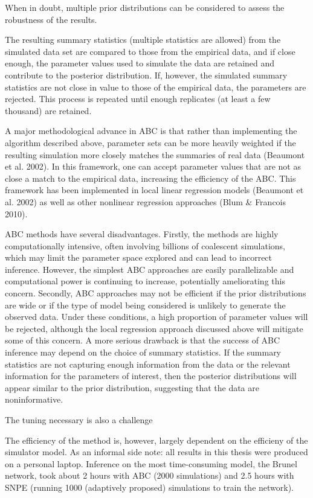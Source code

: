 When in doubt, multiple prior distributions can be considered to assess the robustness of the results. 

The resulting summary statistics (multiple statistics are allowed) from the simulated data set are compared to those from the empirical data, and if close enough, the parameter values used to simulate the data are retained and contribute to the posterior distribution. If, however, the simulated summary statistics are not close in value to those of the empirical data, the parameters are rejected. This process is repeated until enough replicates (at least a few thousand) are retained. 

A major methodological advance in ABC is that rather than implementing the algorithm described above, parameter sets can be more heavily weighted if the resulting simulation more closely matches the summaries of real data (Beaumont et al. 2002). In this framework, one can accept parameter values that are not as close a match to the empirical data, increasing the efficiency of the ABC. This framework has been implemented in local linear regression models (Beaumont et al. 2002) as well as other nonlinear regression approaches (Blum \& Francois 2010). 

ABC methods have several disadvantages. Firstly, the methods are highly computationally intensive, often involving billions of coalescent simulations, which may limit the parameter space explored and can lead to incorrect inference. However, the simplest ABC approaches are easily parallelizable and computational power is continuing to increase, potentially ameliorating this concern. Secondly, ABC approaches may not be efficient if the prior distributions are wide or if the type of model being considered is unlikely to generate the observed data. Under these conditions, a high proportion of parameter values will be rejected, although the local regression  approach discussed above will mitigate some of this concern. A more serious drawback is that the success of ABC inference may depend on the choice of summary statistics. If the summary statistics are not capturing enough information from the data or the relevant information for the parameters of interest, then the posterior distributions will appear similar to the prior distribution, suggesting that the data are noninformative. 


The tuning necessary is also a challenge

The efficiency of the method is, however, largely dependent on the efficieny of the simulator model. As an informal side note: all results in this thesis were produced on a personal laptop. Inference on the most time-consuming model, the Brunel network, took about 2 hours with ABC (2000 simulations) and 2.5 hours with SNPE (running 1000 (adaptively proposed) simulations to train the network). 

